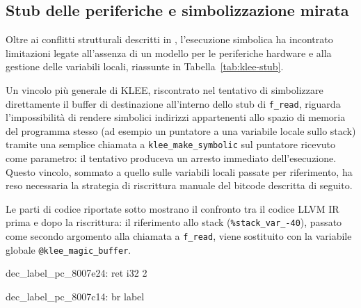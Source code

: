                 
            \FloatBarrier

            
            \subsection{Stub delle periferiche e simbolizzazione mirata}
            \label{subsec:stub_periferiche_klee}
                Oltre ai conflitti strutturali descritti in , l'esecuzione 
                simbolica ha incontrato limitazioni legate all'assenza di un modello 
                per le periferiche hardware e alla gestione delle variabili locali, 
                riassunte in Tabella~\ref{tab:klee-stub}.
                
            Un vincolo più generale di KLEE, riscontrato nel tentativo di 
            simbolizzare direttamente il buffer di destinazione all'interno dello 
            stub di \texttt{f\_read}, riguarda l'impossibilità di rendere simbolici 
            indirizzi appartenenti allo spazio di memoria del programma stesso 
            (ad esempio un puntatore a una variabile locale sullo stack) tramite 
            una semplice chiamata a \texttt{klee\_make\_symbolic} sul puntatore 
            ricevuto come parametro: il tentativo produceva un arresto immediato 
            dell'esecuzione. Questo vincolo, sommato a quello sulle variabili locali 
            passate per riferimento, ha reso necessaria la strategia di riscrittura 
            manuale del bitcode descritta di seguito.

            Le parti di codice riportate sotto mostrano il confronto tra il codice 
            LLVM IR prima e dopo la riscrittura: il riferimento allo stack 
            (\texttt{\%stack\_var\_-40}), passato come secondo argomento alla 
            chiamata a \texttt{f\_read}, viene sostituito con la variabile globale 
            \texttt{@klee\_magic\_buffer}.
            
\begin{llvmcode}
dec_label_pc_8007e24:
  ret i32 2
\end{llvmcode}

\begin{llvmcode}
dec_label_pc_8007c14:
  br label %
\end{llvmcode}
   \FloatBarrier
        

